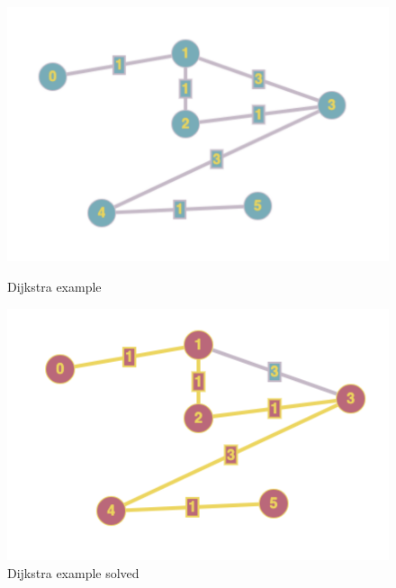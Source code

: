\begin{figure}[h]
\centering
\begin{minipage}{.5\textwidth}
\centering
\includegraphics[width=0.7\linewidth]{img/dijkstraex}
  \caption{Dijkstra example}
  \label{fig:dijkstraex}
\end{minipage}%
\begin{minipage}{.5\textwidth}
\centering
	\includegraphics[width=0.7\linewidth]{img/dijkexsolved}
	\caption{Dijkstra example solved}
	\label{fig:dijkexsolved}
\end{minipage}

\end{figure}


